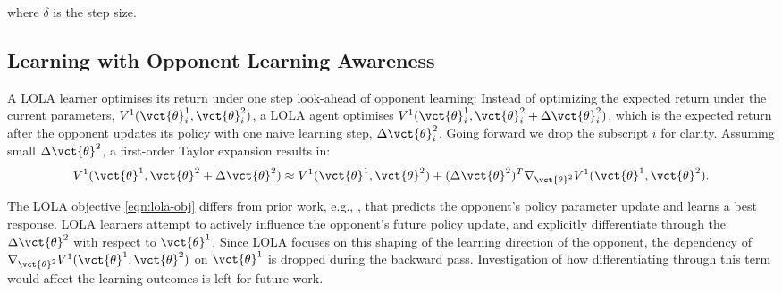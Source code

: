 where $\delta$ is the step size.




\subsection{Learning with Opponent Learning Awareness} \label{sec:lola}
A LOLA learner optimises its return under one step look-ahead of opponent learning: Instead of optimizing the expected return under the current parameters, $V^1(\vct{\theta}^1_{i}, \vct{\theta}^2_{i})$, a LOLA agent optimises $V^1(\vct{\theta}^1_{i}, \vct{\theta}^2_{i}  +\Delta \vct{\theta}^2_{i})$, which is the expected return after the opponent updates its policy with one naive learning step, $\Delta \vct{\theta}^2_{i}$. Going forward  we drop the subscript $i$ for clarity. Assuming small $\Delta \vct{\theta}^2$, a first-order Taylor expansion results in: 
\begin{equation} \label{eqn:lola-obj}
    V^1(\vct{\theta}^1, \vct{\theta}^2  +\Delta \vct{\theta}^2) \approx
    V^1(\vct{\theta}^1, \vct{\theta}^2)+ (\Delta \vct{\theta}^2)^T 
    \nabla_{\vct{\theta}^2}V^1(\vct{\theta}^1, \vct{\theta}^2).
\end{equation}
 
The LOLA objective \eqref{eqn:lola-obj} differs from prior work, e.g., \citet{zhang2010multi}, that predicts the opponent's policy parameter update and learns a best response. LOLA learners attempt to actively influence the opponent's future policy update, and explicitly differentiate through the $\Delta \vct{\theta}^2$ with respect to $\vct{\theta}^1$. Since LOLA focuses on this shaping of the learning direction of the opponent, the dependency of $\nabla_{\vct{\theta}^2} V^1(\vct{\theta}^1, \vct{\theta}^2)$ on $\vct{\theta}^1$ is dropped during the backward pass. Investigation of how differentiating through this term would affect the learning outcomes is left for future work. 

